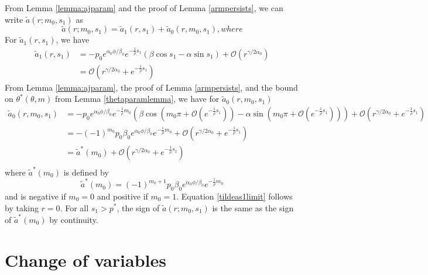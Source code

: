 \documentclass[thesis.tex]{subfiles}
\begin{document}
From Lemma \ref{lemma:ajparam} and the proof of Lemma \ref{armpersists}, we can write $\tilde{a}(r; m_0, s_1)$ as 
\[
\tilde{a}(r; m_0, s_1) = \tilde{a}_1(r, s_1) + \tilde{a}_0(r, m_0, s_1), where
\]
For $\tilde{a}_1(r, s_1)$, we have 
\begin{align*}
\tilde{a}_1(r, s_1) &= -p_0 e^{\alpha_0 \phi/\beta_0} e^{-\frac{1}{\rho}s_1} \left( \beta \cos s_1 - \alpha \sin s_1 \right) + \mathcal{O}(r^{\gamma/2\alpha_0}) \\
&= \mathcal{O}\left(r^{\gamma/2\alpha_0} + e^{-\frac{1}{\rho}s_1} \right)
\end{align*}
From Lemma \ref{lemma:ajparam}, the proof of Lemma \ref{armpersists}, and the bound on $\theta^*(\theta, m)$ from Lemma \ref{thetaparamlemma}, we have for $\tilde{a}_0(r, m_0, s_1)$
\begin{align*}
\tilde{a}_0(r, m_0, s_1) &= -p_0 e^{\alpha_0 \phi/\beta_0} e^{-\frac{1}{\rho}m_0} \left( \beta \cos\left(m_0 \pi + \mathcal{O}\left(e^{-\frac{1}{\rho}s_1} \right) \right) - \alpha \sin \left(m_0 \pi + \mathcal{O}\left(e^{-\frac{1}{\rho}s_1} \right) \right) \right) + \mathcal{O}\left(r^{\gamma/2\alpha_0} + e^{-\frac{1}{\rho}s_1} \right) \\
&= -(-1)^{m_0} p_0 \beta_0 e^{\alpha_0 \phi/\beta_0} e^{-\frac{1}{\rho}m_0} + \mathcal{O}\left(r^{\gamma/2\alpha_0} + e^{-\frac{1}{\rho}s_1} \right) \\
&= \tilde{a}^*(m_0) + \mathcal{O}\left(r^{\gamma/2\alpha_0} + e^{-\frac{1}{\rho}s_1} \right) \\
\end{align*}
where $\tilde{a}^*(m_0)$ is defined by
\[
\tilde{a}^*(m_0) = (-1)^{m_0 + 1} p_0 \beta_0 e^{\alpha_0 \phi/\beta_0} e^{-\frac{1}{\rho}m_0}
\]
and is negative if $m_0 = 0$ and positive if $m_0 = 1$. Equation \cref{tildeas1limit} follows by taking $r = 0$. For all $s_1 > p^*$, the sign of $\tilde{a}(r; m_0, s_1)$ is the same as the sign of $\tilde{a}^*(m_0)$ by continuity.

\section{Change of variables}
\end{document}
